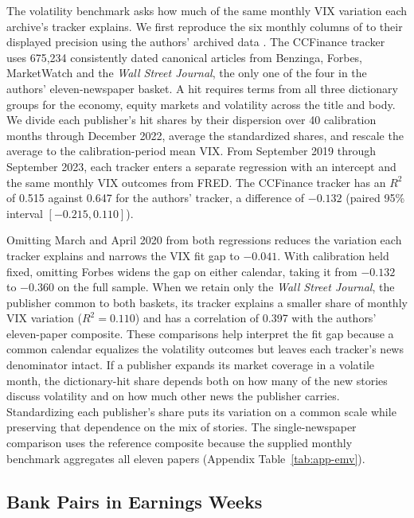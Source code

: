 The volatility benchmark asks how much of the same monthly VIX variation
each archive's tracker explains. We first reproduce the six monthly columns of
\citet{baker2025ms,baker2026} to their displayed precision using the
authors' archived data \citep{baker2025archive}. The CCFinance tracker
uses 675,234 consistently dated canonical articles from Benzinga,
Forbes, MarketWatch and the \emph{Wall Street Journal}, the only one of
the four in the authors' eleven-newspaper basket. A hit requires terms
from all three dictionary groups for the economy, equity markets and
volatility across the title and body. We divide each publisher's hit
shares by their dispersion over 40 calibration months through December
2022, average the standardized shares, and rescale the average to the
calibration-period mean VIX. From September 2019 through September
2023, each tracker enters a separate regression with an intercept and
the same monthly VIX outcomes from FRED. The CCFinance tracker has an
$R^2$ of 0.515 against 0.647 for the authors' tracker, a difference of
$-0.132$ (paired 95\% interval $[-0.215, 0.110]$).

Omitting March and April 2020 from both regressions reduces the
variation each tracker explains and narrows the VIX fit gap to
$-0.041$. With calibration held fixed, omitting Forbes widens the gap
on either calendar, taking it
from $-0.132$ to $-0.360$ on the full sample. When we retain only the
\emph{Wall Street Journal}, the publisher common to both baskets, its
tracker explains a smaller share of monthly VIX variation
($R^2=0.110$) and has a correlation of 0.397 with the authors'
eleven-paper composite. These comparisons help interpret the fit gap
because a common calendar equalizes the volatility outcomes but leaves
each tracker's news denominator intact. If a publisher expands its
market coverage in a volatile month, the dictionary-hit share depends
both on how many of the new stories discuss volatility and on how much
other news the publisher carries. Standardizing each publisher's share
puts its variation on a common scale while preserving that dependence
on the mix of stories. The single-newspaper comparison uses the
reference composite because the supplied monthly benchmark aggregates
all eleven papers (Appendix Table~\ref{tab:app-emv}).

\subsection{Bank Pairs in Earnings Weeks}

